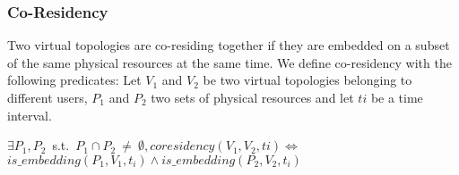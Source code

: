 




\subsubsection{Co-Residency}
\label{sec:prop-cores}
Two virtual topologies are co-residing together if they are embedded on a subset of the same physical resources at the same time.
We define co-residency with the following predicates:
Let $V_1$ and $V_2$ be two virtual topologies belonging to different users, $P_1$ and $P_2$ two sets of physical resources and let $ti$ be a time interval.
\begin{myformula}
$\exists P_1,P_2$~s.t.~$P_1 \cap P_2~\neq~\emptyset, coresidency(V_1,V_2,ti) \Leftrightarrow$\\ $is\_embedding(P_1,V_1,t_i) \wedge is\_embedding(P_2,V_2,t_i)$
\end{myformula}

